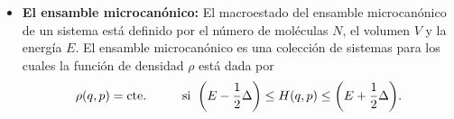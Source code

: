 \begin{itemize}
	\item \textbf{El ensamble microcanónico:}
	El macroestado del ensamble microcanónico de un sistema está 
	definido por el número de moléculas $N$, el volumen $V$ y la 
	energía $E$. El ensamble microcanónico es una colección de
	sistemas para los cuales la función de densidad $\rho$ está 
	dada por 
	\begin{align}
	\rho(q,p)=\text{cte.}\hspace{1cm}
	\text{si} \hspace{2mm}
	\qty(E-\frac{1}{2}\Delta)\leq
	H(q,p)\leq
	\qty(E+\frac{1}{2}\Delta).
	\end{align}
\end{itemize}